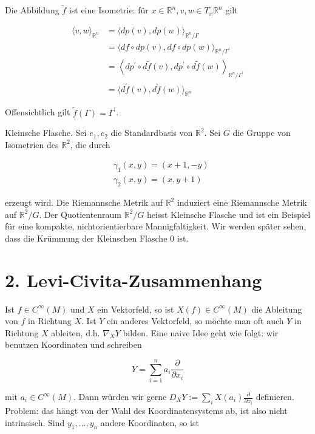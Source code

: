 \documentclass[10pt]{article}
\begin{document}
Die Abbildung $\tilde{f}$ ist eine Isometrie: für $x \in \mathbb{R}^{n}, v, w \in T_{x} \mathbb{R}^{n}$ gilt

$$
\begin{aligned}
\langle v, w\rangle_{\mathbb{R}^{n}} & =\langle d p(v), d p(w)\rangle_{\mathbb{R}^{n} / \Gamma} \\
& =\langle d f \circ d p(v), d f \circ d p(w)\rangle_{\mathbb{R}^{n} / \Gamma^{\prime}} \\
& =\left\langle d p^{\prime} \circ d \tilde{f}(v), d p^{\prime} \circ d \tilde{f}(w)\right\rangle_{\mathbb{R}^{n} / \Gamma^{\prime}} \\
& =\langle d \tilde{f}(v), d \tilde{f}(w)\rangle_{\mathbb{R}^{n}}
\end{aligned}
$$

Offensichtlich gilt $\tilde{f}(\Gamma)=\Gamma^{\prime}$.

Kleinsche Flasche. Sei $e_{1}, e_{2}$ die Standardbasis von $\mathbb{R}^{2}$. Sei $G$ die Gruppe von Isometrien des $\mathbb{R}^{2}$, die durch

$$
\begin{aligned}
& \gamma_{1}(x, y)=(x+1,-y) \\
& \gamma_{2}(x, y)=(x, y+1)
\end{aligned}
$$

erzeugt wird. Die Riemannsche Metrik auf $\mathbb{R}^{2}$ induziert eine Riemannsche Metrik auf $\mathbb{R}^{2} / G$. Der Quotientenraum $\mathbb{R}^{2} / G$ heisst Kleinsche Flasche und ist ein Beispiel für eine kompakte, nichtorientierbare Mannigfaltigkeit. Wir werden später sehen, dass die Krümmung der Kleinschen Flasche 0 ist.

\section*{2. Levi-Civita-Zusammenhang}
Ist $f \in C^{\infty}(M)$ und $X$ ein Vektorfeld, so ist $X(f) \in C^{\infty}(M)$ die Ableitung von $f$ in Richtung $X$. Ist $Y$ ein anderes Vektorfeld, so möchte man oft auch $Y$ in Richtung $X$ ableiten, d.h. $\nabla_{X} Y$ bilden. Eine naive Idee geht wie folgt: wir benutzen Koordinaten und schreiben

$$
Y=\sum_{i=1}^{n} a_{i} \frac{\partial}{\partial x_{i}}
$$

mit $a_{i} \in C^{\infty}(M)$. Dann würden wir gerne $D_{X} Y:=\sum_{i} X\left(a_{i}\right) \frac{\partial}{\partial x_{i}}$ definieren. Problem: das hängt von der Wahl des Koordinatensystems ab, ist also nicht intrinsisch. Sind $y_{1}, \ldots, y_{n}$ andere Koordinaten, so ist
\end{document}
